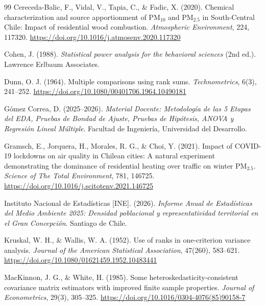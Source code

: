 \documentclass[10pt,twocolumn,a4paper]{article}
\begin{document}
\begin{thebibliography}{99}
\small
{}
Cereceda-Balic, F., Vidal, V., Tapia, C., \& Fadic, X. (2020). Chemical characterization and source apportionment of $\text{PM}_{10}$ and $\text{PM}_{2.5}$ in South-Central Chile: Impact of residential wood combustion. \textit{Atmospheric Environment}, 224, 117320. \url{https://doi.org/10.1016/j.atmosenv.2020.117320}

Cohen, J. (1988). \textit{Statistical power analysis for the behavioral sciences} (2nd ed.). Lawrence Erlbaum Associates.

Dunn, O. J. (1964). Multiple comparisons using rank sums. \textit{Technometrics}, 6(3), 241--252. \url{https://doi.org/10.1080/00401706.1964.10490181}

Gómez Correa, D. (2025--2026). \textit{Material Docente: Metodología de las 5 Etapas del EDA, Pruebas de Bondad de Ajuste, Pruebas de Hipótesis, ANOVA y Regresión Lineal Múltiple}. Facultad de Ingeniería, Universidad del Desarrollo.

Gramsch, E., Jorquera, H., Morales, R. G., \& Choi, Y. (2021). Impact of COVID-19 lockdowns on air quality in Chilean cities: A natural experiment demonstrating the dominance of residential heating over traffic on winter $\text{PM}_{2.5}$. \textit{Science of The Total Environment}, 781, 146725. \url{https://doi.org/10.1016/j.scitotenv.2021.146725}

Instituto Nacional de Estadísticas [INE]. (2026). \textit{Informe Anual de Estadísticas del Medio Ambiente 2025: Densidad poblacional y representatividad territorial en el Gran Concepción}. Santiago de Chile.

Kruskal, W. H., \& Wallis, W. A. (1952). Use of ranks in one-criterion variance analysis. \textit{Journal of the American Statistical Association}, 47(260), 583--621. \url{https://doi.org/10.1080/01621459.1952.10483441}

MacKinnon, J. G., \& White, H. (1985). Some heteroskedasticity-consistent covariance matrix estimators with improved finite sample properties. \textit{Journal of Econometrics}, 29(3), 305--325. \url{https://doi.org/10.1016/0304-4076(85)90158-7}


\end{thebibliography}
\end{document}

